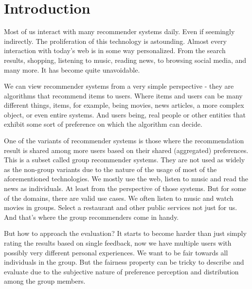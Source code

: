 \chapter{Introduction}  \label{chap_introduction}






Most of us interact with many recommender systems daily. Even if seemingly indirectly. The proliferation of this technology is astounding. Almost every interaction with today's web is in some way personalized. From the search results, shopping, listening to music, reading news, to browsing social media, and many more. It has become quite unavoidable.

We can view recommender systems from a very simple perspective - they are algorithms that recommend items to users. Where items and users can be many different things, items, for example, being movies, news articles, a more complex object, or even entire systems. And users being, real people or other entities that exhibit some sort of preference on which the algorithm can decide.

One of the variants of recommender systems is those where the recommendation result is shared among more users based on their shared (aggregated) preferences. This is a subset called group recommender systems. They are not used as widely as the non-group variants due to the nature of the usage of most of the aforementioned technologies. We mostly use the web, listen to music and read the news as individuals. At least from the perspective of those systems. But for some of the domains, there are valid use cases. We often listen to music and watch movies in groups. Select a restaurant and other public services not just for us. And that's where the group recommenders come in handy.

But how to approach the evaluation? It starts to become harder than just simply rating the results based on single feedback, now we have multiple users with possibly very different personal experiences. We want to be fair towards all individuals in the group. But the fairness property can be tricky to describe and evaluate due to the subjective nature of preference perception and distribution among the group members.

